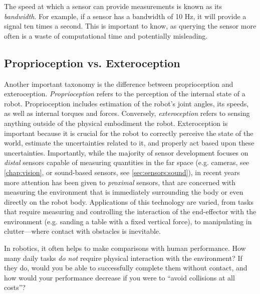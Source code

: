 The speed at which a sensor can provide measurements is known as its  \textsl{bandwidth}. For example, if a sensor has a bandwidth of 10 Hz, it will provide a signal ten times a second. This is important to know, as querying the sensor more often is a waste of computational time and potentially misleading.


\subsection{Proprioception vs. Exteroception}
\label{sec:sensors:proprioception}

Another important taxonomy is the difference between proprioception and exteroception.
\textsl{Proprioception} refers to the perception of the internal state of a robot.
Proprioception includes estimation of the robot's joint angles, its speeds, as well as internal torques and forces.
%
%
\label{sec:sensors:interaction}
%
Conversely, \textsl{exteroception} refers to sensing anything outside of the physical embodiment the robot. Exteroception is important because it is crucial for the robot to correctly perceive the state of the world, estimate the uncertainties related to it, and properly act based upon these uncertainties.
Importantly, while the majority of sensor development focuses on \textsl{distal} sensors capable of measuring quantities in the far space (e.g. cameras, see \cref{chap:vision}, or sound-based sensors, see \cref{sec:sensors:sound}), in recent years more attention has been given to \textsl{proximal} sensors, that are concerned with measuring the environment that is immediately surrounding the body or even directly on the robot body.
Applications of this technology are varied, from tasks that require measuring and controlling the interaction of the end-effector with the environment (e.g. sanding a table with a fixed vertical force), to manipulating in clutter---where contact with obstacles is inevitable.

\begin{mdframed}
In robotics, it often helps to make comparisons with human performance.
How many daily tasks \textsl{do not} require physical interaction with the environment?
If they do, would you be able to successfully complete them without contact, and how would your performance decrease if you were to ``avoid collisions at all costs''?
\end{mdframed}

